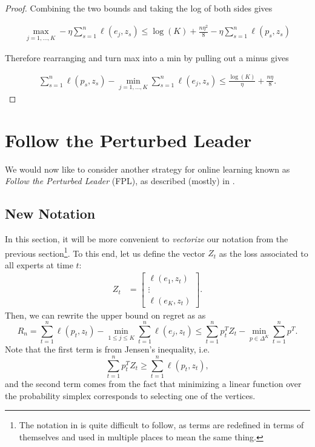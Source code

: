 \begin{proof}
Combining the two bounds and taking the log of both sides gives 

\begin{align*}
\max_{j =1,\dots,K} - \eta \sum_{s=1}^n\ell(e_j,z_s)  \leq \log(K) + 
\frac{n \eta^2}{8} - \eta \sum_{s=1}^{n} \ell(p_s,z_s)  
\end{align*}


Therefore rearranging and turn max into a min by pulling out a minus gives

\begin{align*}
\sum_{s=1}^{n} \ell(p_s,z_s)   - \min_{j =1,\dots,K} \sum_{s=1}^n \ell(e_j,z_s) \leq \frac{\log(K)}{\eta} + \frac{n \eta}{8}. 
\end{align*}

\end{proof}


\section{Follow the Perturbed Leader}

We would now like to consider another strategy for online learning known as \emph{Follow the Perturbed Leader} (FPL), as described (mostly) in \cite[Lecture~16]{rigollet}. 

\subsection{New Notation}
In this section, it will be more convenient to \emph{vectorize} our notation from the previous section\footnote{The notation in \cite[Lecture~16]{rigollet} is quite difficult to follow, as terms are redefined in terms of themselves and used in multiple places to mean the same thing.}. To this end, let us define the vector $Z_t$ as the loss associated to all experts at time $t$:
\begin{align*}
  Z_t &= \begin{bmatrix}
         \ell(e_1, z_t) \\
         \vdots \\
         \ell(e_K, z_t)
       \end{bmatrix}.
\end{align*}
Then, we can rewrite the upper bound on regret as  as
\begin{equation} \label{eqn:regret_bound}
R_n = \sum_{t=1}^n \ell(p_t, z_t) - \min_{1 \leq j \leq K} \sum_{t=1}^n \ell(e_j, z_t) \leq \sum_{t=1}^n p_t^T Z_t - \min_{p \in \Delta^K} \sum_{t=1}^n p^T.
\end{equation}
Note that the first term is from Jensen's inequality, i.e. 
\[
\sum_{t=1}^n p_t^T Z_t \geq \sum_{t=1}^n \ell(p_t, z_t),
\]
and the second term comes from the fact that minimizing a linear function over the probability simplex corresponds to selecting one of the vertices.

